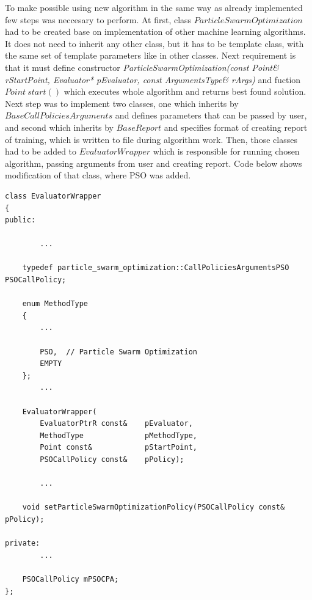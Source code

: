 To make possible using new algorithm in the same way as already implemented few steps was neccesary to perform.
At first, class \(ParticleSwarmOptimization\) had to be created base on implementation of other machine learning algorithms. 
It does not need to inherit any other class, but it has to be template class, with the same set of template parameters like in other classes. 
Next requirement is that it must define constructor \textit{ParticleSwarmOptimization(const Point\& rStartPoint, Evaluator* pEvaluator, const ArgumentsType\& rArgs)} 
and fuction \(Point\ start()\) which executes whole algorithm and returns best found solution.
Next step was to implement two classes, one which inherits by \(BaseCallPoliciesArguments\) and defines parameters that can be passed by user, 
and second which inherits by \(BaseReport\) and specifies format of creating report of training, which is written to file during algorithm work.
Then, those classes had to be added to \(EvaluatorWrapper\) which is responsible for running chosen algorithm, 
passing arguments from user and creating report. Code below shows modification of that class, where PSO was added.
\begin{lstlisting}
class EvaluatorWrapper
{
public:

        ...

    typedef particle_swarm_optimization::CallPoliciesArgumentsPSO	PSOCallPolicy;

    enum MethodType
    {
        ...

        PSO,  // Particle Swarm Optimization
        EMPTY
    };
        ...

    EvaluatorWrapper(
        EvaluatorPtrR const&	pEvaluator,
        MethodType              pMethodType,
        Point const&	        pStartPoint,
        PSOCallPolicy const& 	pPolicy);

        ...
    
    void setParticleSwarmOptimizationPolicy(PSOCallPolicy const& pPolicy);

private:
        ...
    
    PSOCallPolicy mPSOCPA;
};
\end{lstlisting}
    


